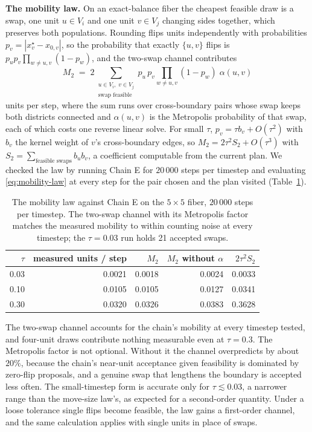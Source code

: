 \documentclass[11pt]{article}
\begin{document}
\textbf{The mobility law.} On an exact-balance fiber the cheapest
feasible draw is a swap, one unit $u \in V_i$ and one unit $v \in V_j$
changing sides together, which preserves both populations. Rounding
flips units independently with probabilities
$p_v = |x^\star_v - x_{0,v}|$, so the probability that exactly
$\{u,v\}$ flips is $p_u p_v \prod_{w \ne u,v}(1 - p_w)$, and the
two-swap channel contributes
\begin{equation}\label{eq:mobility-law}
  M_2 \;=\; 2 \sum_{\substack{u \in V_i,\; v \in V_j \\ \text{swap feasible}}}
  p_u\, p_v \prod_{w \ne u,v} (1 - p_w)\;\alpha(u,v)
\end{equation}
units per step, where the sum runs over cross-boundary pairs whose
swap keeps both districts connected and $\alpha(u,v)$ is the
Metropolis probability of that swap, each of which costs one reverse
linear solve. For small $\tau$, $p_v = \tau b_v + O(\tau^2)$ with
$b_v$ the kernel weight of $v$'s cross-boundary edges, so
$M_2 = 2\tau^2 S_2 + O(\tau^3)$ with
$S_2 = \sum_{\text{feasible swaps}} b_u b_v$, a coefficient computable
from the current plan. We checked the law by running Chain E for
$20\,000$ steps per timestep and evaluating \eqref{eq:mobility-law}
at every step for the pair chosen and the plan visited
(Table~\ref{tab:mobility-law}).

\begin{table}[htbp]
\centering
\small
\begin{tabular}{rrrrr}
\toprule
$\tau$ & measured units / step & $M_2$ & $M_2$ without $\alpha$ & $2\tau^2 S_2$ \\
\midrule
0.03 & 0.0021 & 0.0018 & 0.0024 & 0.0033 \\
0.10 & 0.0105 & 0.0105 & 0.0127 & 0.0341 \\
0.30 & 0.0320 & 0.0326 & 0.0383 & 0.3628 \\
\bottomrule
\end{tabular}
\caption{The mobility law against Chain E on the $5 \times 5$ fiber,
  $20\,000$ steps per timestep. The two-swap channel with its
  Metropolis factor matches the measured mobility to within counting
  noise at every timestep; the $\tau = 0.03$ run holds 21 accepted
  swaps.}\label{tab:mobility-law}
\end{table}

The two-swap channel accounts for the chain's mobility at every
timestep tested, and four-unit draws contribute nothing measurable
even at $\tau = 0.3$. The Metropolis factor is not optional. Without
it the channel overpredicts by about $20\%$, because the chain's
near-unit acceptance given feasibility is dominated by zero-flip
proposals, and a genuine swap that lengthens the boundary is accepted
less often. The small-timestep form is accurate only for
$\tau \lesssim 0.03$, a narrower range than the move-size law's, as
expected for a second-order quantity. Under a loose tolerance single
flips become feasible, the law gains a first-order channel, and the
same calculation applies with single units in place of swaps.
\end{document}
